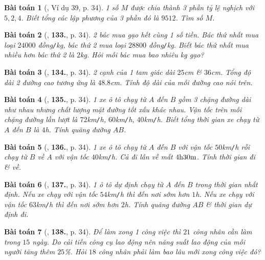 \documentclass{article}
\numberwithin{equation}{section}
\newtheorem{baitoan}{Bài toán}
\begin{document}
\begin{baitoan}[\cite{Tuyen_Toan_7}, Ví dụ 39, p. 34]
	1 số $M$ được chia thành 3 phần tỷ lệ nghịch với $5,2,4$. Biết tổng các lập phương của 3 phần đó là $9512$. Tìm số $M$.
\end{baitoan}

\begin{baitoan}[\cite{Tuyen_Toan_7}, \textbf{133.}, p. 34]
	2 bác mua gạo hết cùng 1 số tiền. Bác thứ nhất mua loại $24000$ \emph{đồng\texttt{/}kg}, bác thứ 2 mua loại $28800$ \emph{đồng\texttt{/}kg}. Biết bác thứ nhất mua nhiều hơn bác thứ 2 là $2$\emph{kg}. Hỏi mỗi bác mua bao nhiêu \emph{kg} gạo?
\end{baitoan}

\begin{baitoan}[\cite{Tuyen_Toan_7}, \textbf{134.}, p. 34]
	2 cạnh của 1 tam giác dài $25$\emph{cm} \& $36$\emph{cm}. Tổng độ dài 2 đường cao tương ứng là $48.8$\emph{cm}. Tính độ dài của mỗi đường cao nói trên.
\end{baitoan}

\begin{baitoan}[\cite{Tuyen_Toan_7}, \textbf{135.}, p. 34]
	1 xe ô tô chạy từ $A$ đến $B$ gồm 3 chặng đường dài như nhau nhưng chất lượng mặt đường tốt xấu khác nhau. Vận tốc trên mỗi chặng đường lần lượt là $72$\emph{km\texttt{/}h}, $60$\emph{km\texttt{/}h}, $40$\emph{km\texttt{/}h}. Biết tổng thời gian xe chạy từ $A$ đến $B$ là $4$\emph{h}. Tính quãng đường $AB$.
\end{baitoan}

\begin{baitoan}[\cite{Tuyen_Toan_7}, \textbf{136.}, p. 34]	
	1 xe ô tô chạy từ $A$ đến $B$ với vận tốc $50$\emph{km\texttt{/}h} rồi chạy từ $B$ về $A$ với vận tốc $40$\emph{km\texttt{/}h}. Cả đi lẫn về mất $\rm4h30m$. Tính thời gian đi \& về.
\end{baitoan}

\begin{baitoan}[\cite{Tuyen_Toan_7}, \textbf{137.}, p. 34]
	1 ô tô dự định chạy từ $A$ đến $B$ trong thời gian nhất định. Nếu xe chạy với vận tốc $54$\emph{km\texttt{/}h} thì đến nơi sớm hơn $1$\emph{h}. Nếu xe chạy với vận tốc $63$\emph{km\texttt{/}h} thì đến nơi sớm hơn $2$\emph{h}. Tính quãng đường $AB$ \& thời gian dự định đi.
\end{baitoan}

\begin{baitoan}[\cite{Tuyen_Toan_7}, \textbf{138.}, p. 34]
	Để làm xong 1 công việc thì $21$ công nhân cần làm trong $15$ ngày. Do cải tiến công cụ lao động nên năng suất lao động của mỗi người tăng thêm $25$\%. Hỏi $18$ công nhân phải làm bao lâu mới xong công việc đó?
\end{baitoan}
\end{document}
